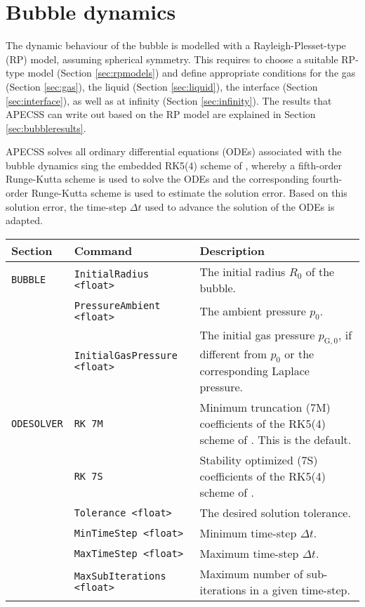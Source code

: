 \chapter{Bubble dynamics}
\label{chap:bubble}
The dynamic behaviour of the bubble is modelled with a Rayleigh-Plesset-type (RP) model, assuming spherical symmetry. This requires to choose a suitable RP-type model (Section \ref{sec:rpmodels}) and define appropriate conditions for the gas  (Section \ref{sec:gas}), the liquid (Section \ref{sec:liquid}), the interface (Section \ref{sec:interface}), as well as at infinity (Section \ref{sec:infinity}). The results that APECSS can write out based on the RP model are explained in Section \ref{sec:bubbleresults}.

APECSS solves all ordinary differential equations (ODEs) associated with the bubble dynamics sing the embedded RK5(4) scheme of \citet{Dormand1980}, whereby a fifth-order Runge-Kutta scheme is used to solve the ODEs and the corresponding fourth-order Runge-Kutta scheme is used to estimate the solution error. Based on this solution error, the time-step $\Delta t$ used to advance the solution of the ODEs is adapted. 

\vspace{0.8em}

\noindent
\begin{tabular}{p{} p{} p{}}
    \textbf{Section} &\textbf{Command} & \textbf{Description} 
\vspace{1mm} \\ \hline
{\tt BUBBLE} & {\tt InitialRadius <float>} & The initial radius $R_0$ of the bubble.\\ 
 & {\tt PressureAmbient <float>} & The ambient pressure $p_0$.\\ 
 & {\tt InitialGasPressure <float>} & The initial gas pressure $p_{\mathrm{G},0}$, if different from $p_0$ or the corresponding Laplace pressure.\\ 
{\tt ODESOLVER} & {\tt RK 7M} & Minimum truncation (7M) coefficients of the RK5(4) scheme of \citet{Dormand1980}. This is the default.\\ 
& {\tt RK 7S} & Stability optimized (7S) coefficients of the RK5(4) scheme of \citet{Dormand1980}.\\ 
& {\tt Tolerance <float>} & The desired solution tolerance.\\ 
& {\tt MinTimeStep <float>} & Minimum time-step $\Delta t$.\\ 
& {\tt MaxTimeStep <float>} & Maximum time-step $\Delta t$.\\ 
& {\tt MaxSubIterations <float>} & Maximum number of sub-iterations in a given time-step.\\ 
 \hline
\end{tabular} \vspace{1em}

